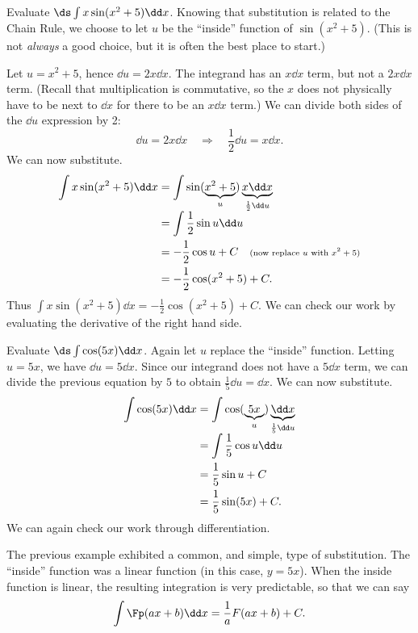 \begin{example}\label{ex_sub1}
Evaluate $\ds \int x\sin(x^2+5)\dd x$.
\solution
Knowing that substitution is related to the Chain Rule, we choose to let $u$ be the ``inside'' function of $\sin(x^2+5)$. (This is not \emph{always} a good choice, but it is often the best place to start.)

Let $u = x^2+5$, hence $\dd u = 2x\dd x$. The integrand has an $x\dd x$ term, but not a $2x\dd x$ term. (Recall that multiplication is commutative, so the $x$ does not physically have to be next to $\dd x$ for there to be an $x\dd x$ term.) We can divide both sides of the $\dd u$ expression by 2:
\[\dd u = 2x\dd x \quad \Rightarrow \quad \frac12\dd u = x\dd x.\]
We can now substitute.
\begin{align*}
	\int x\sin(x^2+5)\dd x
	&= \int \sin(\underbrace{x^2+5}_u) \underbrace{x\dd x}_{\frac12\dd u}\\[-.3\baselineskip]
	&= \int \frac12\sin u\dd u \\
	&= -\frac12\cos u + C \quad \text{\scriptsize (now replace $u$ with $x^2+5$)}\\
	&=-\frac12\cos(x^2+5) + C.
\end{align*}
Thus $\int x\sin(x^2+5)\dd x = -\frac12\cos(x^2+5)+C$. We can check our work by evaluating the derivative of the right hand side.
\end{example}

\begin{example}\label{ex_sub2}
Evaluate $\ds \int \cos(5x)\dd x$.
\solution
Again let $u$ replace the ``inside'' function. Letting $u = 5x$, we have $\dd u = 5\dd x$. Since our integrand does not have a $5\dd x$ term, we can divide the previous equation by $5$ to obtain $\frac15\dd u = \dd x$. We can now substitute.
\begin{align*}
	\int \cos(5x)\dd x
	&= \int \cos(\underbrace{5x}_u) \underbrace{\dd x}_{\frac15\dd u} \\[-.3\baselineskip]
	&=	\int \frac15\cos u \dd u \\
	&= \frac15\sin u + C \\
	&= \frac15\sin (5x)+C.
\end{align*}
We can again check our work through differentiation.
\end{example}

The previous example exhibited a common, and simple, type of substitution. The ``inside'' function was a linear function (in this case, $y = 5x$). When the inside function is linear, the resulting integration is very predictable, so that we can say\vspace{-.3\baselineskip}
\[\int \Fp(ax+b)\dd x = \frac{1}{a}F(ax+b) + C.\]

